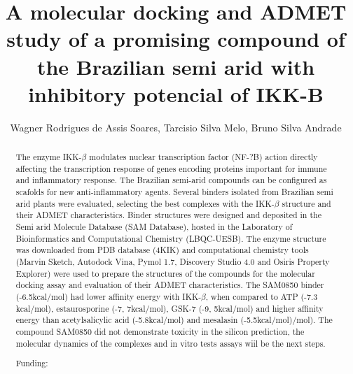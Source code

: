 \documentclass[twoside]{article}
\title{\vspace{-15mm}\fontsize{24pt}{10pt}\selectfont\textbf{ A molecular docking and ADMET study of a promising compound of the Brazilian semi arid with inhibitory potencial of IKK-B }} %
\author{ Wagner Rodrigues de Assis Soares, Tarcisio Silva Melo, Bruno Silva Andrade }
\affil{ Universidade Estadual dom Sudoeste da Bahia }
\date{}
\begin{document}
  
  
  \maketitle %
  
  
  \thispagestyle{fancy} %
  
  
  \begin{abstract}
  The enzyme IKK-$\beta$ modulates nuclear transcription factor (NF-?B) action directly affecting the transcription response of genes encoding proteins important for immune and inflammatory response. The Brazilian semi-arid compounds can be configured as scafolds for new anti-inflammatory agents. Several binders isolated from Brazilian semi arid plants were evaluated,  selecting the best complexes with the IKK-$\beta$ structure and their ADMET characteristics. Binder structures were designed and deposited in the Semi arid Molecule Database (SAM Database),  hosted in the Laboratory of Bioinformatics and Computational Chemistry (LBQC-UESB). The enzyme structure was downloaded from PDB database (4KIK) and computational chemistry tools (Marvin Sketch,  Autodock Vina,  Pymol 1.7,  Discovery Studio 4.0 and Osiris Property Explorer) were used to prepare the structures of the compounds for the molecular docking assay and evaluation of their ADMET characteristics. The SAM0850 binder (-6.5kcal/mol) had lower affinity energy with IKK-$\beta$,  when compared to ATP (-7.3 kcal/mol),  estaurosporine (-7, 7kcal/mol),  GSK-7 (-9, 5kcal/mol) and higher affinity energy than acetylsalicylic acid (-5.8kcal/mol) and mesalasin (-5.5kcal/mol)/mol). The compound SAM0850 did not demonstrate toxicity in the silicon prediction,  the molecular dynamics of the complexes and in vitro tests assays wiil be the next steps.
  
  Funding:  \\ 
  \end{abstract}
  
\end{document}
